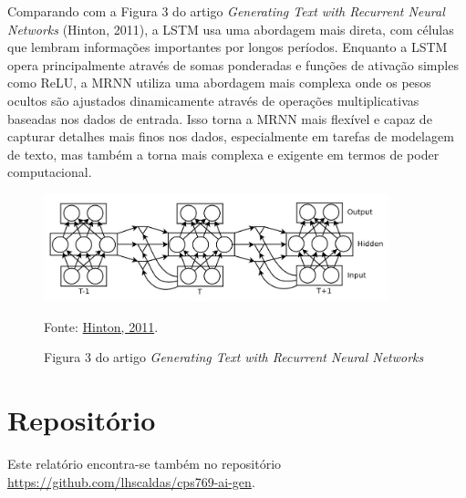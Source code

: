\documentclass[12 pt]{article}
\begin{document}
Comparando com a Figura 3 do artigo \textit{Generating Text with Recurrent Neural Networks} (Hinton, 2011), a LSTM usa uma abordagem mais direta, com células que lembram informações importantes por longos períodos. Enquanto a LSTM opera principalmente através de somas ponderadas e funções de ativação simples como ReLU, a MRNN utiliza uma abordagem mais complexa onde os pesos ocultos são ajustados dinamicamente através de operações multiplicativas baseadas nos dados de entrada. Isso torna a MRNN mais flexível e capaz de capturar detalhes mais finos nos dados, especialmente em tarefas de modelagem de texto, mas também a torna mais complexa e exigente em termos de poder computacional.

\begin{figure}[H]
    \caption{Figura 3 do artigo \textit{Generating Text with Recurrent Neural Networks}}
    \centering
    \includegraphics[width=10cm]{fig/fig3_hinton2011.jpg}
    \small
    
    Fonte: \href{https://www.researchgate.net/publication/221345823_Generating_Text_with_Recurrent_Neural_Networks}{Hinton, 2011}.
\end{figure}


\section*{Repositório}
Este relatório encontra-se também no repositório \href{https://github.com/lhscaldas/cps769-ai-gen}{https://github.com/lhscaldas/cps769-ai-gen}.
\end{document}
